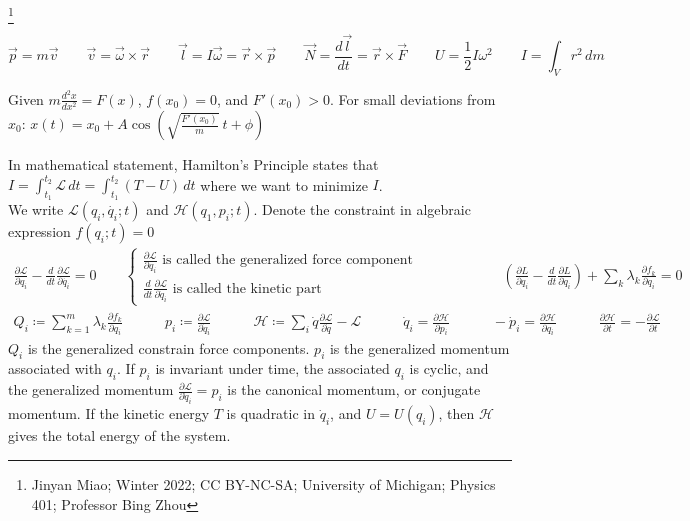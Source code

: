 \documentclass[9pt,oneside]{book}
\theoremstyle{break}
\theoremstyle{break}
\newcommand{\pd}{\partial}
\newcommand\blfootnote[1]{%
  \begingroup
  \renewcommand\thefootnote{}\footnote{#1}%
  \addtocounter{footnote}{-1}%
  \endgroup
}
\begin{document}
\blfootnote{Jinyan Miao; Winter 2022; CC BY-NC-SA; University of Michigan; Physics 401; Professor Bing Zhou}
$$\vec{p} = m\vec{v}\qquad \vec{v} = \vec{\omega}\times \vec{r} \qquad \vec{l} = I\vec{\omega} = \vec{r}\times \vec{p}\qquad \vec{N} = \frac{d\vec{l}}{dt}=\vec{r}\times \vec{F}\qquad U = \frac{1}{2}I \omega^2 \qquad I = \int_V r^2\, dm$$

Given $m\frac{d^2x}{dx^2} = F(x)$, $f(x_0) = 0$, and $F'(x_0) >0$. For small deviations from $x_0$: $x(t) = x_0 + A\cos\left(\sqrt{\frac{F'(x_0)}{m}}\ t+ \phi\right)$

In mathematical statement, Hamilton's Principle states that $I = \int_{t_1}^{t_2}\mathcal{L} \, dt = \int_{t_1}^{t_2}(T-U)\, dt $ where we want to minimize $I$. \\We write $\mathcal{L}(q_i, \dot{q_i}; t)$ and $\mathcal{H}(q_1, p_i;t)$. Denote the constraint in algebraic expression $f(q_i; t) = 0$
\begin{align*}
\frac{\pd \mathcal{L}}{\pd q_i} - \frac{d}{dt}\frac{\pd \mathcal{L}}{\pd \dot{q_i}} = 0 \qquad \begin{cases} \frac{\pd \mathcal{L}}{\pd q_i} \text{ is called the generalized force component}\\
\frac{d}{dt}\frac{\pd \mathcal{L}}{\pd \dot{q}_i} \text{ is called the kinetic part}
\end{cases} \qquad\qquad\qquad \left( \frac{\pd L}{\pd q_i} - \frac{d}{dt}\frac{\pd L}{\pd \dot{q}_i} \right) + \sum_k \lambda_k \frac{\pd f_k}{\pd q_i} = 0
\end{align*}
\begin{align*}
 Q_i \coloneqq \sum_{k=1}^m \lambda_k \frac{\partial f_k}{\partial q_i} \quad\qquad p_i  \coloneqq \frac{\partial \mathcal{L}}{\partial \dot{q}_i} \qquad\quad \mathcal{H} \coloneqq \sum_{i}\dot{q}\frac{\partial \mathcal{L}}{\partial \dot{q}} -\mathcal{L} \qquad\quad\dot{q}_i = \frac{\partial \mathcal{H}}{\partial p_i} \qquad\quad -\dot{p}_i = \frac{\partial \mathcal{H}}{\partial q_i} \qquad\quad \frac{\partial \mathcal{H}}{\partial t} = -\frac{\partial \mathcal{L}}{\partial t}
\end{align*}
$Q_i$ is the generalized constrain force components.
$p_i$ is the generalized momentum associated with $q_i$.
If $p_i$ is invariant under time, the associated $q_i$ is cyclic, and the generalized momentum $\frac{\partial \mathcal{L}}{\partial \dot{q}_i} = p_i$ is the canonical momentum, or conjugate momentum. If the kinetic energy $T$ is quadratic in $\dot{q}_i$, and $U = U(q_i)$, then $\mathcal{H}$ gives the total energy of the system.
\end{document}
